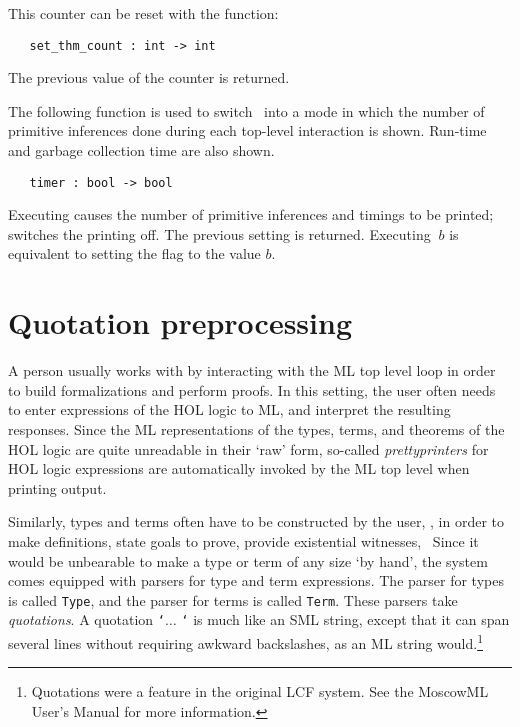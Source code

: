 \noindent This counter can be reset with the function:

\begin{boxed}
\begin{verbatim}
   set_thm_count : int -> int
\end{verbatim}\end{boxed}

\noindent The previous value of the counter is returned.

The following function is used to switch \ML\ into a  mode in  which the number
of primitive inferences done during each top-level interaction is  shown.
Run-time and garbage collection time are also shown.

\begin{boxed}
\begin{verbatim}
   timer : bool -> bool
\end{verbatim}\end{boxed}

\noindent Executing  causes  the number  of primitive inferences
and timings to be  printed;  switches  the printing  off.  The
previous setting  is
returned.    Executing  $\ b$  is equivalent to
setting the flag  to the value $b$.


\section{Quotation preprocessing}

A person usually works with \holn{} by interacting with the ML top level
loop in order to build formalizations and perform proofs. In this
setting, the user often needs to enter expressions of the HOL logic to
ML, and interpret the resulting responses. Since the ML representations
of the types, terms, and theorems of the HOL logic are quite unreadable
in their `raw' form, so-called {\it prettyprinters\/} for HOL logic
expressions are automatically invoked by the ML top level when printing
output.

Similarly, types and terms often have to be constructed by the user,
\eg, in order to make definitions, state goals to prove, provide
existential witnesses, \etc\ Since it would be unbearable to make a type
or term of any size `by hand', the system comes equipped with parsers
for type and term expressions. The parser for types is called
\verb+Type+, and the parser for terms is called \verb+Term+. These
parsers take {\it quotations\/}.  A quotation {\tt `}$\ldots$ {\tt `} is
much like an SML string, except that it can span several lines without
requiring awkward backslashes, as an ML string
would.\footnote{Quotations were a feature in the original LCF
system. See the MoscowML User's Manual for more information.}

